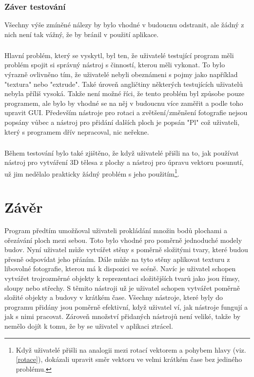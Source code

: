 \documentclass[11pt,twoside,a4paper]{book}
\begin{document}
\subsection{Záver testování}
Všechny výše zmíněné nálezy by bylo vhodné v budoucnu odstranit, ale žádný z nich není tak vážný, že by bránil v použití aplikace.
\paragraph{}
Hlavní problém, který se vyskytl, byl ten, že uživatelé testující program měli problém spojit si správný nástroj s činností, kterou měli vykonat. To bylo výrazně ovlivněno tím, že uživatelé nebyli obeznámeni s pojmy jako například "textura" nebo "extrude". Také úroveň angličtiny některých testujících uživatelů nebyla příliš vysoká. Takže není možné říci, že tento problém byl způsobe pouze programem, ale bylo by vhodné se na něj v budoucnu více zaměřit a podle toho upravit GUI. Především nástroje pro rotaci a zvětšení/změnšení fotografie nejsou popsány vůbec a nástroj pro přidání dalších ploch je popsán "Pl" což uživateli, který s programem dřív nepracoval, nic neřekne.
\paragraph{}
Během testování bylo také zjištěno, že když uživatelé přišli na to, jak používat nástroj pro vytváření 3D tělesa z plochy a nástroj pro úpravu vektoru posunutí, už jim nedělalo prakticky žádný problém s jeho použitím\footnote{Když uživatelé přišli na analogii mezi rotací vektorem a pohybem hlavy (viz. \ref{rotace}), dokázali upravit směr vektoru ve velmi krátkém čase bez jediného problému.}.  

%
%
%
\chapter{Závěr}
Program předtím umožňoval uživateli prokládání množin bodů plochami a ořezávání ploch mezi sebou. Toto bylo vhodné pro poměrně jednoduché modely budov. Nyní uživatel může vytvářet stěny s poměrně složitými tvary, které budou přesně odpovídat jeho přáním. Dále může na tyto stěny aplikovat texturu z libovolné fotografie, kterou má k dispozici ve scéně. Navíc je uživatel schopen vytvářet trojrozměrné objekty k reprezentaci složitějších tvarů jako jsou římsy, sloupy nebo střechy. S těmito nástroji už je uživatel schopen vytvářet poměrně složité objekty a budovy v krátkém čase. Všechny nástroje, které byly do programu přidány jsou poměrně efektivní, když uživatel ví, jak nástroje fungují a jak s nimi pracovat. Zároveň množství přidaných nástrojů není veliké, takže by nemělo dojít k tomu, že by se uživatel v aplikaci ztrácel.
\end{document}
